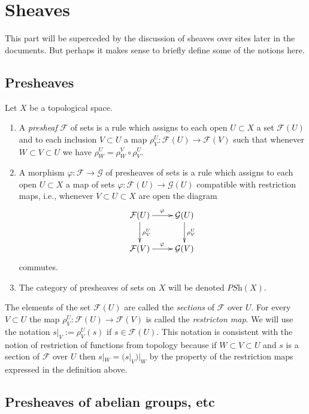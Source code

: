 \section{Sheaves}
\label{section-sheaves}

\noindent
This part will be superceded by the discussion of sheaves
over sites later in the documents. But perhaps it makes 
sense to briefly define some of the notions here.

\subsection{Presheaves}
\label{subsection-presheaves}

\begin{definition}
\label{definition-presheaf}
Let $X$ be a topological space.
\begin{enumerate}
\item A {\it presheaf} $\mathcal{F}$ of sets is a rule which
assigns to each open $U \subset X$ a set $\mathcal{F}(U)$ and
to each inclusion $V \subset U$ a map
$\rho^U_V : \mathcal{F}(U) \to \mathcal{F}(V)$ such that
whenever $W \subset V \subset U$ we have 
$\rho^U_W = \rho^V_W \circ \rho ^U_V$.
\item A morphism $\varphi : \mathcal{F} \to \mathcal{G}$ 
of presheaves of sets is a rule which assigns to each
open $U \subset X$ a map of sets $\varphi : \mathcal{F}(U)
\to \mathcal{G}(U)$ compatible with restriction maps,
i.e., whenever $V \subset U \subset X$ are open the
diagram
$$
\xymatrix{
\mathcal{F}(U) \ar[r]^\varphi \ar[d]^{\rho^U_V} &
\mathcal{G}(U) \ar[d]^{\rho^U_V} \cr
\mathcal{F}(V) \ar[r]^\varphi & \mathcal{G}(V)
}
$$
commutes.
\item The category of presheaves of sets on $X$ will be denoted
$\textit{PSh}(X)$.
\end{enumerate}
\end{definition}

\noindent
The elements of the set $\mathcal{F}(U)$ are called
the {\it sections} of $\mathcal{F}$ over $U$.
For every $V \subset U$ the map
$\rho^U_V : \mathcal{F}(U) \to \mathcal{F}(V)$
is called the {\it restricton map}. We will use the
notation $s|_V := \rho^U_V(s)$ if $s\in \mathcal{F}(U)$.
This notation is consistent with the notion of restriction
of functions from topology because if $W \subset V \subset U$
and $s$ is a section of $\mathcal{F}$ over $U$ then
$s|_W = (s|_V)|_W$ by the property of the restriction maps
expressed in the definition above.

\subsection{Presheaves of abelian groups, etc}
\label{subsection-abelian-presheaves}

